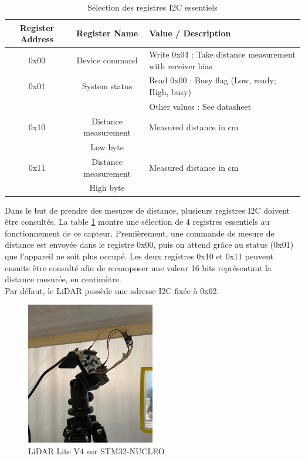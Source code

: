 \begin{table}[H]
    \centering
    \begin{tabular}{|c|c|m{7cm}|}
        \hline
        Register Address & Register Name & Value / Description \\
        \hline\hline
        0x00 & Device command & Write 0x04 : Take distance measurement with receiver bias \\
        \hline
        0x01 & System status & Read 0x00 : Busy flag (Low, ready; High, busy) \\
        &&                     Other values : See datasheet \\
        \hline
        0x10 & Distance measurement & Measured distance in cm \\ &Low byte& \\
        \hline
        0x11 & Distance measurement & Measured distance in cm \\ &High byte& \\
        \hline
    \end{tabular}
    \caption{Sélection des registres I2C essentiels}
    \label{table:LiDARI2C}
\end{table}

Dans le but de prendre des mesures de distance, plusieurs registres I2C doivent être consultés. La
table \ref{table:LiDARI2C} montre une sélection de 4 registres essentiels au fonctionnement de ce capteur.
Premièrement, une commande de mesure de distance est envoyée dans le registre 0x00, puis on attend
grâce au status (0x01) que l'appareil ne soit plus occupé. Les deux registres 0x10 et 0x11 peuvent ensuite
être consulté afin de recomposer une valeur 16 bits représentant la distance mesurée, en centimètre.\\
Par défaut, le LiDAR possède une adresse I2C fixée à 0x62.

\begin{figure}[H]
    \centering
    \includegraphics[width=0.5\textwidth]{Images/LiDAR/LiDAROnNucleo.jpeg}
    \caption{LiDAR Lite V4 sur STM32-NUCLEO}
    \label{fig:LiDAROnNUCLEO}
\end{figure}
\newpage

